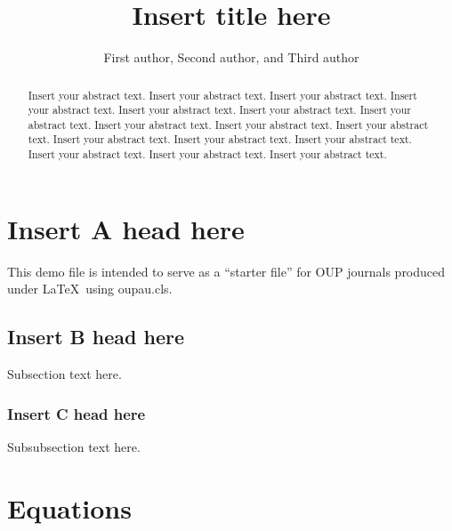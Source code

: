 \documentclass[times]{oupau}
\begin{document}

\title{Insert title here}

\author{First author,
Second author,  and  Third author\corrauth}

\address{Insert address here\\
Insert address here}

\begin{abstract}
Insert your abstract text. Insert your abstract text. Insert your abstract text. Insert your abstract text.
Insert your abstract text. Insert your abstract text. Insert your abstract text. Insert your abstract text.
Insert your abstract text. Insert your abstract text. Insert your abstract text. Insert your abstract text.
Insert your abstract text. Insert your abstract text. Insert your abstract text. Insert your abstract text.
\end{abstract}



\maketitle


\section{Insert A head here}
This demo file is intended to serve as a ``starter file''
for OUP journals produced under \LaTeX\ using oupau.cls.

\subsection{Insert B head here}
Subsection text here.


\subsubsection{Insert C head here}
Subsubsection text here.

\section{Equations}
\end{document}
